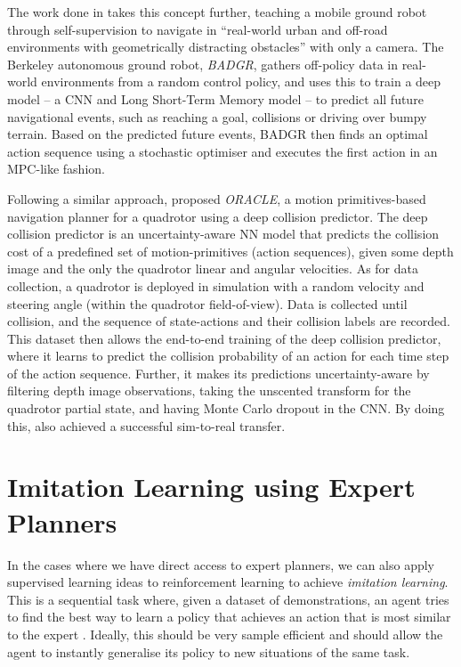 The work done in \cite{Badgr} takes this concept further, teaching a mobile ground robot through self-supervision to navigate in ``real-world urban and off-road environments with geometrically distracting obstacles'' with only a camera. The Berkeley autonomous ground robot, \textit{BADGR}, gathers off-policy data in real-world environments from a random control policy, and uses this to train a deep model -- a CNN and Long Short-Term Memory \cite{LSTM} model -- to predict all future navigational events, such as reaching a goal, collisions or driving over bumpy terrain. 
Based on the predicted future events, BADGR then finds an optimal action sequence using a stochastic optimiser \cite{BADGR_stochastic_optimiser} and executes the first action in an MPC-like fashion.

\begin{comment}
    Safe Visual Navigation via Deep Learning and Novelty Detection -- has a collision prediction network, trained from input action pairs -- uses an autoencoder for novelty detection, measures uncertainty in the network -- transitions between high-performance learned model and conservative simple prior.
\end{comment}

Following a similar approach, \cite{deepCollisionPredictorOracle} proposed \textit{ORACLE}, a motion primitives-based navigation planner for a quadrotor using a deep collision predictor. The deep collision predictor is an uncertainty-aware NN model that predicts the collision cost of a predefined set of motion-primitives (action sequences), given some depth image and the only the quadrotor linear and angular velocities.
As for data collection, a quadrotor is deployed in simulation with a random velocity and steering angle  (within the quadrotor field-of-view). Data is collected until collision, and the sequence of state-actions and their collision labels are recorded. This dataset then allows the end-to-end training of the deep collision predictor, where it learns to predict the collision probability of an action for each time step of the action sequence. Further, it makes its predictions uncertainty-aware by filtering depth image observations, taking the unscented transform for the quadrotor partial state, and having Monte Carlo dropout in the CNN. By doing this, \cite{deepCollisionPredictorOracle} also achieved a successful sim-to-real transfer.

\section{Imitation Learning using Expert Planners}
\label{sec:3_imitation_learning}
In the cases where we have direct access to expert planners, we can also apply supervised learning ideas to reinforcement learning to achieve \textit{imitation learning}. This is a sequential task where, given a dataset of demonstrations, an agent tries to find the best way to learn a policy that achieves an action that is most similar to the expert \cite{imitationLearningOverview}. Ideally, this should be very sample efficient and should allow the agent to instantly generalise its policy to new situations of the same task.

